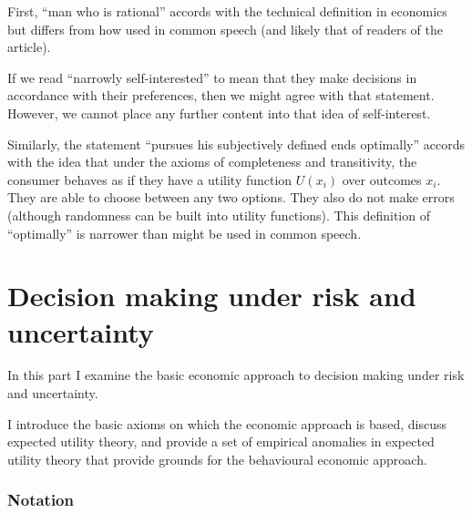 \documentclass[
  letterpaper,
  DIV=11,
  numbers=noendperiod]{scrreprt}
\begin{document}
\begin{tcolorbox}[enhanced jigsaw, title=\textcolor{quarto-callout-tip-color}{\faLightbulb}\hspace{0.5em}{Answer}, toprule=.15mm, colback=white, breakable, titlerule=0mm, colframe=quarto-callout-tip-color-frame, coltitle=black, opacityback=0, rightrule=.15mm, colbacktitle=quarto-callout-tip-color!10!white, bottomtitle=1mm, opacitybacktitle=0.6, arc=.35mm, bottomrule=.15mm, toptitle=1mm, leftrule=.75mm, left=2mm]

First, ``man who is rational'' accords with the technical definition in
economics but differs from how used in common speech (and likely that of
readers of the article).

If we read ``narrowly self-interested'' to mean that they make decisions
in accordance with their preferences, then we might agree with that
statement. However, we cannot place any further content into that idea
of self-interest.

Similarly, the statement ``pursues his subjectively defined ends
optimally'' accords with the idea that under the axioms of completeness
and transitivity, the consumer behaves as if they have a utility
function \(U(x_i)\) over outcomes \(x_i\). They are able to choose
between any two options. They also do not make errors (although
randomness can be built into utility functions). This definition of
``optimally'' is narrower than might be used in common speech.

\end{tcolorbox}

\part{Decision making under risk and uncertainty}

In this part I examine the basic economic approach to decision making
under risk and uncertainty.

I introduce the basic axioms on which the economic approach is based,
discuss expected utility theory, and provide a set of empirical
anomalies in expected utility theory that provide grounds for the
behavioural economic approach.

\hypertarget{notation}{%
\section*{Notation}\label{notation}}

\end{document}
